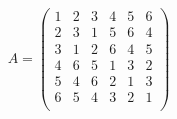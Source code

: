 \documentclass[a4paper,12pt,twoside]{article}
\begin{document}
\subsection{}%
\begin{equation}
	A = \begin{pmatrix}
		 1 & 2 & 3 & 4 & 5 & 6 \\
		 2 & 3 & 1 & 5 & 6 & 4 \\
		 3 & 1 & 2 & 6 & 4 & 5 \\
		 4 & 6 & 5 & 1 & 3 & 2 \\
		 5 & 4 & 6 & 2 & 1 & 3 \\
		 6 & 5 & 4 & 3 & 2 & 1 \\
	\end{pmatrix}
\end{equation}






\end{document}
